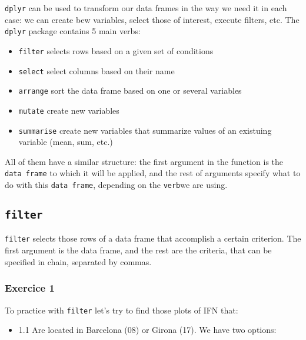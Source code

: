 \documentclass[]{article}
\newenvironment{Shaded}{\begin{snugshade}}{\end{snugshade}}
\newcommand{\KeywordTok}[1]{\textcolor[rgb]{0.13,0.29,0.53}{\textbf{#1}}}
\newcommand{\StringTok}[1]{\textcolor[rgb]{0.31,0.60,0.02}{#1}}
\newcommand{\CommentTok}[1]{\textcolor[rgb]{0.56,0.35,0.01}{\textit{#1}}}
\newcommand{\OperatorTok}[1]{\textcolor[rgb]{0.81,0.36,0.00}{\textbf{#1}}}
\newcommand{\NormalTok}[1]{#1}
\providecommand{\tightlist}{%
  \setlength{\itemsep}{0pt}\setlength{\parskip}{0pt}}
\begin{document}
\texttt{dplyr} can be used to transform our data frames in the way we
need it in each case: we can create bew variables, select those of
interest, execute filters, etc. The \texttt{dplyr} package contains 5
main verbs:

\begin{itemize}
\item
  \texttt{filter} selects rows based on a given set of conditions
\item
  \texttt{select} select columns based on their name
\item
  \texttt{arrange} sort the data frame based on one or several variables
\item
  \texttt{mutate} create new variables
\item
  \texttt{summarise} create new variables that summarize values of an
  existuing variable (mean, sum, etc.)
\end{itemize}

All of them have a similar structure: the first argument in the function
is the \texttt{data\ frame} to which it will be applied, and the rest of
arguments specify what to do with this \texttt{data\ frame}, depending
on the \texttt{verb}we are using.

\subsection{\texorpdfstring{\texttt{filter}}{filter}}\label{filter}

\texttt{filter} selects those rows of a data frame that accomplish a
certain criterion. The first argument is the data frame, and the rest
are the criteria, that can be specified in chain, separated by commas.

\subsubsection{Exercice 1}\label{exercice-1}

To practice with \texttt{filter} let's try to find those plots of IFN
that:

\begin{itemize}
\tightlist
\item
  1.1 Are located in Barcelona (08) or Girona (17). We have two options:
\end{itemize}

\begin{Shaded}
\end{Shaded}
\end{document}
